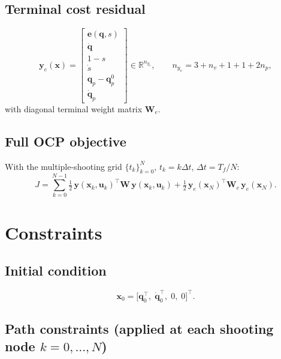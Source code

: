 \documentclass[11pt, a4paper]{article}
\newcommand{\R}{\mathbb{R}}
\newcommand{\qd}{\bm{q}}          %
\newcommand{\dqd}{\dot{\bm{q}}}   %
\newcommand{\qp}{\bm{q}_p}        %
\begin{document}
\subsection{Terminal cost residual}

\begin{equation}
  \bm{y}_e(\bm{x}) =
  \begin{bmatrix}
    \bm{e}(\qd, s)   \\[2pt]
    \dqd             \\[2pt]
    1 - s            \\[2pt]
    \dot{s}          \\[2pt]
    \qp - \qp^0      \\[2pt]
    \dqd_p
  \end{bmatrix}
  \in \R^{n_{y_e}},
  \qquad
  n_{y_e} = 3 + n_v + 1 + 1 + 2n_p,
\end{equation}
with diagonal terminal weight matrix $\bm{W}_e$.

\subsection{Full OCP objective}

With the multiple-shooting grid $\{t_k\}_{k=0}^N$, $t_k = k \Delta t$, $\Delta t = T_f/N$:
\begin{equation}
  J = \sum_{k=0}^{N-1} \tfrac{1}{2}\,\bm{y}(\bm{x}_k, \bm{u}_k)^\top
      \bm{W}\,\bm{y}(\bm{x}_k, \bm{u}_k)
    + \tfrac{1}{2}\,\bm{y}_e(\bm{x}_N)^\top \bm{W}_e\,\bm{y}_e(\bm{x}_N).
\end{equation}

\section{Constraints}

\subsection{Initial condition}

\begin{equation}
  \bm{x}_0 = \bigl[\qd_0^\top,\;\dqd_0^\top,\;0,\;0\bigr]^\top.
\end{equation}

\subsection{Path constraints (applied at each shooting node $k = 0,\dots,N$)}
\end{document}

